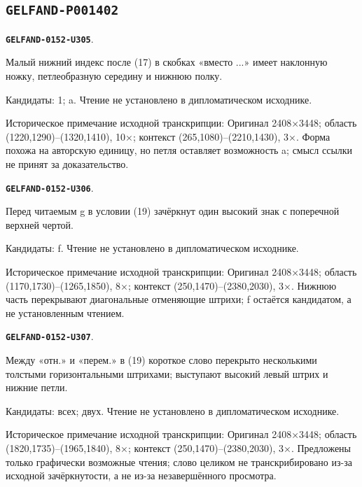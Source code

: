 \documentclass[11pt]{article}
\theoremstyle{definition}
\theoremstyle{remark}
\begin{document}
\subsection*{\texttt{GELFAND-P001402}}
\par\noindent\leavevmode{}\label{GELFAND-0152-U305}\label{GELFAND-P001402:remark-18-subscript:note}\textbf{\texttt{GELFAND-0152-U305}}.\nopagebreak[4]\par
Малый нижний индекс после (17) в скобках «вместо ...» имеет наклонную ножку, петлеобразную середину и нижнюю полку.\par
Кандидаты: 1; a. Чтение не установлено в дипломатическом исходнике.\par
Историческое примечание исходной транскрипции: Оригинал 2408×3448; область (1220,1290)–(1320,1410), 10×; контекст (265,1080)–(2210,1430), 3×. Форма похожа на авторскую единицу, но петля оставляет возможность a; смысл ссылки не принят за доказательство.\par\medskip
\par\noindent\leavevmode{}\label{GELFAND-0152-U306}\label{GELFAND-P001402:cancelled-19-symbol:note}\textbf{\texttt{GELFAND-0152-U306}}.\nopagebreak[4]\par
Перед читаемым g в условии (19) зачёркнут один высокий знак с поперечной верхней чертой.\par
Кандидаты: f. Чтение не установлено в дипломатическом исходнике.\par
Историческое примечание исходной транскрипции: Оригинал 2408×3448; область (1170,1730)–(1265,1850), 8×; контекст (250,1470)–(2380,2030), 3×. Нижнюю часть перекрывают диагональные отменяющие штрихи; f остаётся кандидатом, а не установленным чтением.\par\medskip
\par\noindent\leavevmode{}\label{GELFAND-0152-U307}\label{GELFAND-P001402:cancelled-19-word:note}\textbf{\texttt{GELFAND-0152-U307}}.\nopagebreak[4]\par
Между «отн.» и «перем.» в (19) короткое слово перекрыто несколькими толстыми горизонтальными штрихами; выступают высокий левый штрих и нижние петли.\par
Кандидаты: всех; двух. Чтение не установлено в дипломатическом исходнике.\par
Историческое примечание исходной транскрипции: Оригинал 2408×3448; область (1820,1735)–(1965,1840), 8×; контекст (250,1470)–(2380,2030), 3×. Предложены только графически возможные чтения; слово целиком не транскрибировано из-за исходной зачёркнутости, а не из-за незавершённого просмотра.\par\medskip
\end{document}

